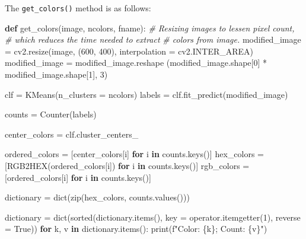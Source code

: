 \documentclass[11pt]{article}
\newenvironment{Shaded}{}{}
\newcommand{\KeywordTok}[1]{\textcolor[rgb]{0.00,0.44,0.13}{\textbf{{#1}}}}
\newcommand{\DecValTok}[1]{\textcolor[rgb]{0.25,0.63,0.44}{{#1}}}
\newcommand{\CommentTok}[1]{\textcolor[rgb]{0.38,0.63,0.69}{\textit{{#1}}}}
\newcommand{\NormalTok}[1]{{#1}}
\newcommand{\SpecialCharTok}[1]{\textcolor[rgb]{0.25,0.44,0.63}{{#1}}}
\newcommand{\SpecialStringTok}[1]{\textcolor[rgb]{0.73,0.40,0.53}{{#1}}}
\newcommand{\VariableTok}[1]{\textcolor[rgb]{0.10,0.09,0.49}{{#1}}}
\newcommand{\ControlFlowTok}[1]{\textcolor[rgb]{0.00,0.44,0.13}{\textbf{{#1}}}}
\newcommand{\OperatorTok}[1]{\textcolor[rgb]{0.40,0.40,0.40}{{#1}}}
\newcommand{\BuiltInTok}[1]{{#1}}
\begin{document}
The \texttt{get\_colors()} method is as follows:

\begin{Shaded}
\begin{Highlighting}[]
\KeywordTok{def}\NormalTok{ get_colors(image, ncolors, fname):}
        \CommentTok{# Resizing images to lessen pixel count,}
        \CommentTok{# which reduces the time needed to extract}
        \CommentTok{# colors from image.}
\NormalTok{        modified_image }\OperatorTok{=}\NormalTok{ cv2.resize(image, (}\DecValTok{600}\NormalTok{, }\DecValTok{400}\NormalTok{), }
\NormalTok{            interpolation }\OperatorTok{=}\NormalTok{ cv2.INTER_AREA)}
\NormalTok{        modified_image }\OperatorTok{=}\NormalTok{ modified_image.reshape}
\NormalTok{            (modified_image.shape[}\DecValTok{0}\NormalTok{] }\OperatorTok{*}\NormalTok{ modified_image.shape[}\DecValTok{1}\NormalTok{], }\DecValTok{3}\NormalTok{)}
        
\NormalTok{        clf }\OperatorTok{=}\NormalTok{ KMeans(n_clusters }\OperatorTok{=}\NormalTok{ ncolors)}
\NormalTok{        labels }\OperatorTok{=}\NormalTok{ clf.fit_predict(modified_image)}

\NormalTok{        counts }\OperatorTok{=}\NormalTok{ Counter(labels)}

\NormalTok{        center_colors }\OperatorTok{=}\NormalTok{ clf.cluster_centers_}

\NormalTok{        ordered_colors }\OperatorTok{=}\NormalTok{ [center_colors[i] }\ControlFlowTok{for}\NormalTok{ i }\KeywordTok{in}\NormalTok{ counts.keys()]}
\NormalTok{        hex_colors }\OperatorTok{=}\NormalTok{ [RGB2HEX(ordered_colors[i]) }\ControlFlowTok{for}\NormalTok{ i }\KeywordTok{in}\NormalTok{ counts.keys()]}
\NormalTok{        rgb_colors }\OperatorTok{=}\NormalTok{ [ordered_colors[i] }\ControlFlowTok{for}\NormalTok{ i }\KeywordTok{in}\NormalTok{ counts.keys()]}

\NormalTok{        dictionary }\OperatorTok{=} \BuiltInTok{dict}\NormalTok{(}\BuiltInTok{zip}\NormalTok{(hex_colors, counts.values()))}

\NormalTok{        dictionary }\OperatorTok{=} \BuiltInTok{dict}\NormalTok{(}\BuiltInTok{sorted}\NormalTok{(dictionary.items(),}
\NormalTok{            key }\OperatorTok{=}\NormalTok{ operator.itemgetter(}\DecValTok{1}\NormalTok{), reverse }\OperatorTok{=} \VariableTok{True}\NormalTok{))}
        \ControlFlowTok{for}\NormalTok{ k, v }\KeywordTok{in}\NormalTok{ dictionary.items():}
            \BuiltInTok{print}\NormalTok{(}\SpecialStringTok{f"Color: }\SpecialCharTok{\{k\}}\SpecialStringTok{; Count: }\SpecialCharTok{\{v\}}\SpecialStringTok{"}\NormalTok{)}


\end{Highlighting}
\end{Shaded}
\end{document}
